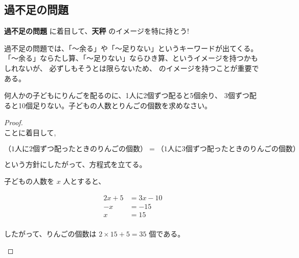 \subsection{過不足の問題}

    \begin{techniquebox}[tech:07]{\textbf{過不足の問題}}
        \fitblankbf[変わらないものの量]{} に着目して、\textbf{天秤} のイメージを特に持とう!
    \end{techniquebox}

    過不足の問題では、「〜余る」や「〜足りない」というキーワードが出てくる。
    「〜余る」ならたし算、「〜足りない」ならひき算、というイメージを持つかもしれないが、
    必ずしもそうとは限らないため、 のイメージを持つことが重要である。

\begin{example}[【例題 5】]
    何人かの子どもにりんごを配るのに、1人に2個ずつ配ると5個余り、
    3個ずつ配ると10個足りない。子どもの人数とりんごの個数を求めなさい。
\end{example}

\begin{proof}\mbox{}\\
    ことに着目して,

    \[（1人に2個ずつ配ったときのりんごの個数）=（1人に3個ずつ配ったときのりんごの個数）\]

    という方針にしたがって、方程式を立てる。

    \begin{hiddenanswer}
        子どもの人数を $x$ 人とすると、
        \vspace{1em}

        \begin{align*}
            2x + 5 &= 3x - 10 \\
            -x &= -15 \\
            x &= 15 \\
        \end{align*}

        したがって、りんごの個数は $2 \times 15 + 5 = 35$ 個である。

    \end{hiddenanswer}
\end{proof}
\newpage
